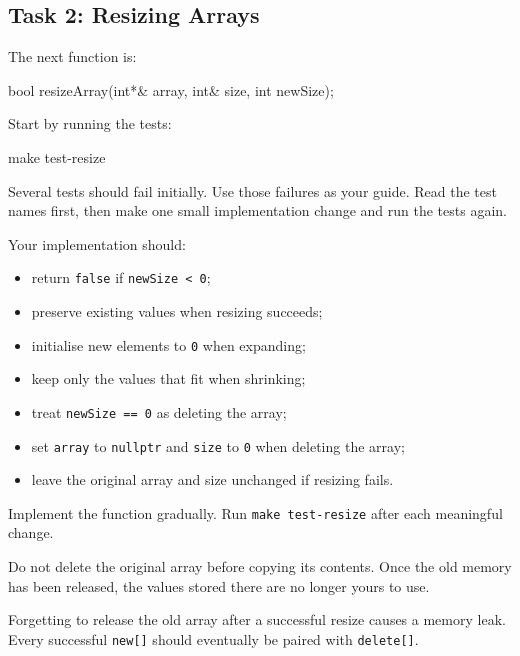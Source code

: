 \documentclass{csc2059practical}
\begin{document}
\subsection{Task 2: Resizing Arrays}

The next function is:

\begin{cppcode}
bool resizeArray(int*& array,
                 int& size,
                 int newSize);
\end{cppcode}

Start by running the tests:

\begin{bashcode}
make test-resize
\end{bashcode}

Several tests should fail initially. Use those failures as your guide. Read the test names first, then make one small implementation change and run the tests again.

Your implementation should:
\begin{itemize}
  \item return \texttt{false} if \texttt{newSize < 0};
  \item preserve existing values when resizing succeeds;
  \item initialise new elements to \texttt{0} when expanding;
  \item keep only the values that fit when shrinking;
  \item treat \texttt{newSize == 0} as deleting the array;
  \item set \texttt{array} to \texttt{nullptr} and \texttt{size} to \texttt{0} when deleting the array;
  \item leave the original array and size unchanged if resizing fails.
\end{itemize}

Implement the function gradually. Run \texttt{make test-resize} after each meaningful change.

\begin{commonerror}
Do not delete the original array before copying its contents. Once the old memory has been released, the values stored there are no longer yours to use.
\end{commonerror}

\begin{commonerror}
Forgetting to release the old array after a successful resize causes a memory leak. Every successful \texttt{new[]} should eventually be paired with \texttt{delete[]}.
\end{commonerror}
\end{document}
